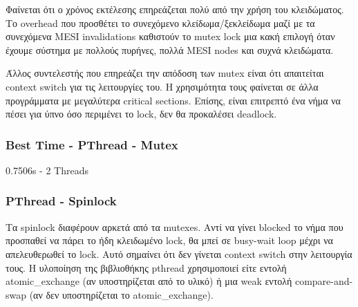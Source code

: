 \documentclass[letterpaper,12pt]{article}
\begin{document}
Φαίνεται ότι ο χρόνος εκτέλεσης επηρεάζεται πολύ από την χρήση του κλειδώματος. Το overhead
που προσθέτει το συνεχόμενο κλείδωμα/ξεκλείδωμα μαζί με τα συνεχόμενα MESI invalidations
καθιστούν το mutex lock μια κακή επιλογή όταν έχουμε σύστημα με πολλούς πυρήνες, πολλά MESI nodes και συχνά
κλειδώματα.

Άλλος συντελεστής που επηρεάζει την απόδοση των mutex είναι ότι απαιτείται context switch για τις
λειτουργίες του. Η χρησιμότητα τους φαίνεται σε άλλα προγράμματα με μεγαλύτερα critical sections.
Επίσης, είναι επιτρεπτό ένα νήμα να πέσει για ύπνο όσο περιμένει το lock, δεν θα προκαλέσει deadlock.

\subsubsection*{Best Time - PThread - Mutex}
0.7506s - 2 Threads

\subsubsection{PThread - Spinlock}

Τα spinlock διαφέρουν αρκετά από τα mutexes. Αντί να γίνει blocked το νήμα που προσπαθεί να πάρει το ήδη
κλειδωμένο lock, θα μπεί σε busy-wait loop μέχρι να απελευθερωθεί το lock. Αυτό σημαίνει ότι δεν γίνεται
context switch στην λειτουργία τους. Η υλοποίηση της βιβλιοθήκης pthread χρησιμοποιεί είτε εντολή
atomic\_exchange (αν υποστηρίζεται από το υλικό) ή μια weak εντολή compare-and-swap (αν δεν υποστηρίζεται το atomic\_exchange).
\end{document}
